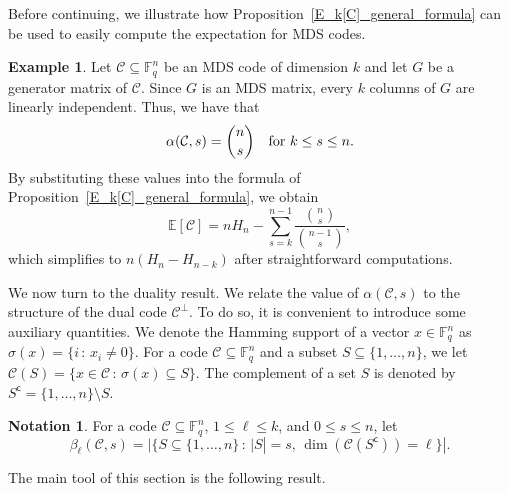 \documentclass[11pt,a4paper,reqno,twoside]{article}
\theoremstyle{definition}
\newtheorem{notation}[theorem]{Notation}
\newtheorem{example}[theorem]{Example}
\newcommand{\F}{\mathbb{F}}
\newcommand{\mC}{\mathcal{C}}
\begin{document}
Before continuing, we illustrate how Proposition~\ref{E_k[C]_general_formula} can be used to easily compute the expectation for MDS codes.

\begin{example}
    Let $\mC \subseteq \F_q^n$ be an MDS code of dimension $k$ and let $G$ be a generator matrix of $\mC$. Since $G$ is an MDS matrix, every $k$ columns of $G$ are linearly independent. Thus, we have that
    \[
    \alpha(\mC,s) = \binom{n}{s} \quad \textnormal{for $k \le s \le n$}.
    \]
    By substituting these values into the formula of Proposition~\ref{E_k[C]_general_formula}, we obtain
    \[
    \mathbb{E}[\mC] = nH_n - \sum_{s=k}^{n-1} \frac{\binom{n}{s}}{\binom{n-1}{s}},
    \]
    which simplifies to $n(H_n - H_{n-k})$ after straightforward computations.
\end{example}

We now turn to the duality result.
We relate 
the value of $\alpha(\mathcal{C},s)$ to the structure of the dual code $\mC^\perp$. To do so,
it is convenient to introduce some auxiliary quantities. We denote the Hamming support of a vector $x \in \F_q^n$ as $\sigma(x)=\{i \, :\, x_i \neq 0\}$.
For a code $\mC \subseteq \F_q^n$ and a subset $S \subseteq \{1, \ldots, n\}$, we let $\mC(S)=\{x \in \mC \, : \, \sigma(x) \subseteq S\}$. The complement of a set $S$ is denoted by $S^{\mathsf{c}}=\{1, \ldots, n\} \setminus S$.

\begin{notation} \label{beta_definition}
For a code $\mC \subseteq \F_q^n$, $1 \le \ell \le k$, and $0 \le s \le n$, let
\begin{equation*} 
\beta_{\ell}(\mathcal{C},s) = |\{ S \subseteq \{1, \ldots, n\} \, : \, |S| = s, \, \dim(\mathcal{C}(S^{\mathsf{c}}))=\ell \}|.
\end{equation*}
\end{notation}


The main tool of this section is the following result.
\end{document}
